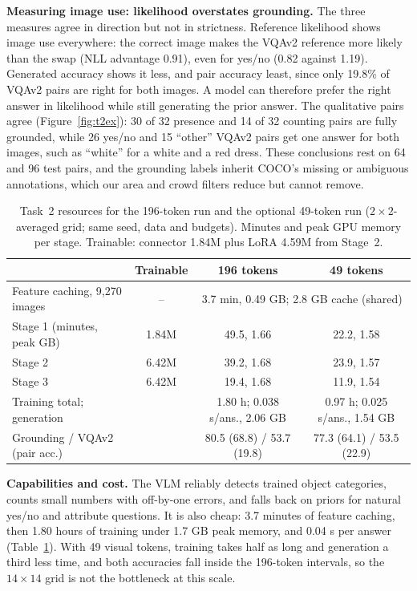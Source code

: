 \documentclass{article}
\begin{document}
\textbf{Measuring image use: likelihood overstates grounding.} The three measures agree in direction but not in strictness. Reference likelihood shows image use everywhere: the correct image makes the VQAv2 reference more likely than the swap (NLL advantage 0.91), even for yes/no (0.82 against 1.19). Generated accuracy shows it less, and pair accuracy least, since only 19.8\% of VQAv2 pairs are right for both images. A model can therefore prefer the right answer in likelihood while still generating the prior answer. The qualitative pairs agree (Figure~\ref{fig:t2ex}): 30 of 32 presence and 14 of 32 counting pairs are fully grounded, while 26 yes/no and 15 ``other'' VQAv2 pairs get one answer for both images, such as ``white'' for a white and a red dress. These conclusions rest on 64 and 96 test pairs, and the grounding labels inherit COCO's missing or ambiguous annotations, which our area and crowd filters reduce but cannot remove.

\begin{table}[t]
\centering
\caption{Task~2 resources for the 196-token run and the optional 49-token run ($2{\times}2$-averaged grid; same seed, data and budgets). Minutes and peak GPU memory per stage. Trainable: connector 1.84M plus LoRA 4.59M from Stage~2.}
\label{tab:t2-res}
\small
\setlength{\tabcolsep}{4pt}
\begin{tabular}{lccc}
\toprule
 & Trainable & 196 tokens & 49 tokens\\
\midrule
Feature caching, 9,270 images & -- & \multicolumn{2}{c}{3.7 min, 0.49 GB; 2.8 GB cache (shared)}\\
Stage 1 (minutes, peak GB) & 1.84M & 49.5, 1.66 & 22.2, 1.58\\
Stage 2 & 6.42M & 39.2, 1.68 & 23.9, 1.57\\
Stage 3 & 6.42M & 19.4, 1.68 & 11.9, 1.54\\
Training total; generation & & 1.80 h; 0.038 s/ans., 2.06 GB & 0.97 h; 0.025 s/ans., 1.54 GB\\
Grounding / VQAv2 (pair acc.) & & 80.5 (68.8) / 53.7 (19.8) & 77.3 (64.1) / 53.5 (22.9)\\
\bottomrule
\end{tabular}
\end{table}

\textbf{Capabilities and cost.} The VLM reliably detects trained object categories, counts small numbers with off-by-one errors, and falls back on priors for natural yes/no and attribute questions. It is also cheap: 3.7 minutes of feature caching, then 1.80 hours of training under 1.7 GB peak memory, and 0.04 s per answer (Table~\ref{tab:t2-res}). With 49 visual tokens, training takes half as long and generation a third less time, and both accuracies fall inside the 196-token intervals, so the $14\times14$ grid is not the bottleneck at this scale.
\end{document}
